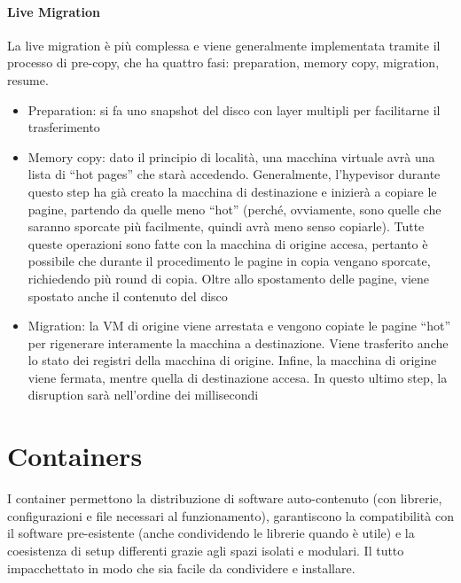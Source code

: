 \documentclass{article}
\begin{document}
		\paragraph{Live Migration}
		La live migration è più complessa e viene generalmente implementata tramite il processo di pre-copy, che ha quattro fasi: preparation, memory copy, migration, resume.
		\begin{itemize}
			\item Preparation: si fa uno snapshot del disco con layer multipli per facilitarne il
			trasferimento
			\item Memory copy: dato il principio di località, una macchina virtuale avrà una lista di
			“hot pages” che starà accedendo. Generalmente, l’hypevisor durante questo step
			ha già creato la macchina di destinazione e inizierà a copiare le pagine, partendo da quelle meno “hot” (perché, ovviamente, sono quelle che
			saranno sporcate più facilmente, quindi avrà meno senso copiarle). Tutte queste operazioni sono fatte con la macchina di origine
			accesa, pertanto è possibile che durante il procedimento le pagine in copia vengano sporcate, richiedendo più round di copia. Oltre allo spostamento delle pagine, viene spostato anche il contenuto del disco
			\item Migration: la VM di origine viene arrestata e vengono copiate le
			pagine “hot” per rigenerare interamente la macchina a destinazione. Viene trasferito
			anche lo stato dei registri della macchina di origine. Infine, la macchina di origine
			viene fermata, mentre quella di destinazione accesa. In questo ultimo step, la
			disruption sarà nell’ordine dei millisecondi
		\end{itemize}
		
		\newpage
		\section{Containers}
		I container permettono la distribuzione di software auto-contenuto (con librerie, configurazioni e file necessari al funzionamento), garantiscono la compatibilità con il software pre-esistente (anche condividendo le librerie quando è utile) e la coesistenza di setup differenti grazie agli spazi isolati e modulari. Il tutto impacchettato in modo che sia facile da condividere e installare.\\ 
		
\end{document}
